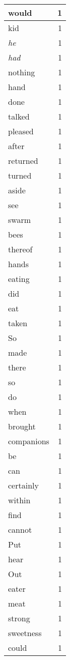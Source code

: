 \begin{center}
\begin{longtable}{l|r}
would & 1\\ \hline 
kid & 1\\ \hline 
\emph{he} & 1\\ \hline 
\emph{had} & 1\\ \hline 
nothing & 1\\ \hline 
hand & 1\\ \hline 
done & 1\\ \hline 
talked & 1\\ \hline 
pleased & 1\\ \hline 
after & 1\\ \hline 
returned & 1\\ \hline 
turned & 1\\ \hline 
aside & 1\\ \hline 
see & 1\\ \hline 
swarm & 1\\ \hline 
bees & 1\\ \hline 
thereof & 1\\ \hline 
hands & 1\\ \hline 
eating & 1\\ \hline 
did & 1\\ \hline 
eat & 1\\ \hline 
taken & 1\\ \hline 
So & 1\\ \hline 
made & 1\\ \hline 
there & 1\\ \hline 
so & 1\\ \hline 
do & 1\\ \hline 
when & 1\\ \hline 
brought & 1\\ \hline 
companions & 1\\ \hline 
be & 1\\ \hline 
can & 1\\ \hline 
certainly & 1\\ \hline 
within & 1\\ \hline 
find & 1\\ \hline 
cannot & 1\\ \hline 
Put & 1\\ \hline 
hear & 1\\ \hline 
Out & 1\\ \hline 
eater & 1\\ \hline 
meat & 1\\ \hline 
strong & 1\\ \hline 
sweetness & 1\\ \hline 
could & 1\\ \hline 

\end{longtable}
\end{center}
